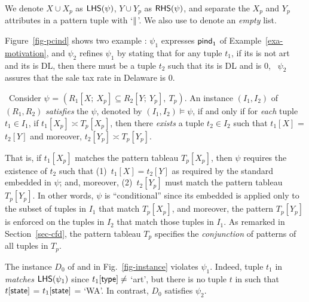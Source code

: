  We denote $X \cup X_p$ as ${\mathsf{LHS}}(\psi)$, $Y \cup Y_p$ as ${\mathsf{RHS}}(\psi)$, and
separate the $X_p$ and $Y_p$ attributes in a pattern tuple with
`$\parallel$'. We also use  to denote an {\em empty} list. 



\vspace{-0.5ex}
\begin{example}
\label{exam-pcind} Figure~\ref{fig-pcind} shows two example \pCINDs:
$\psi_1$ expresses ${\mathsf{pind}}_1$ of Example~\ref{exa-motivation},
and $\psi_2$ refines $\psi_1$ by stating that for any 
tuple $t_1$, if its  is not art and its  is DL,
then there must be a  tuple $t_2$ such that its 
is DL and  is $0$, \ie~$\psi_2$ assures that the sale tax
rate in Delaware is 0. \eop
\end{example}
\vspace{-1ex}






~Consider \pCIND $\psi$ =
$(R_1[X;\ X_p] \subseteq R_2[Y;\ Y_p],\ T_p)$.
An instance  $(I_1, I_2)$ of $(R_1, R_2)$ {\em satisfies} the \pCIND
$\psi$, denoted by $(I_1, I_2) \models \psi$, if and only if for {\em each}
tuple $t_1\in I_1$, if $t_1[X_p] \asymp T_p[X_p]$, then there {\em
exists} a tuple $t_2\in I_2$ such that $t_1[X]$ = $t_2[Y]$ and
moreover, $t_2[Y_p] \asymp T_p[Y_p]$.


That is, if $t_1[X_p]$ matches
the pattern tableau $T_p[X_p]$, then $\psi$ requires the
existence of $t_2$ such that (1)~$t_1[X] = t_2[Y]$ as
required by the standard \IND embedded in $\psi$;
and, moreover, (2)~$t_2[Y_p]$
must match the pattern tableau $T_p[Y_p]$. In other words,
$\psi$ is ``conditional'' since its embedded \IND is applied only to the
subset of tuples in $I_1$ that match $T_p[X_p]$, and moreover,
the pattern $T_p[Y_p]$ is enforced on the tuples in $I_2$
that match those tuples in $I_1$. As remarked in Section~\ref{sec-cfd},
the pattern tableau $T_p$ specifies the {\em conjunction} of
patterns of all tuples in $T_p$.

\vspace{-0.5ex}
\begin{example}
The instance $D_0$ of  and  in
Fig.~\ref{fig-instance} violates \pCIND $\psi_1$. Indeed, tuple
$t_1$ in  {\em matches} ${\mathsf{LHS}}(\psi_1)$ since
$t_1[\protect\mathsf{type}] \ne $ `art', but there is no tuple $t$ in 
such that $t[\protect\mathsf{state}]$ = $t_1[\protect\mathsf{state}]$ = `WA'. In contrast,
$D_0$ satisfies $\psi_2$.
\eop
\end{example}


